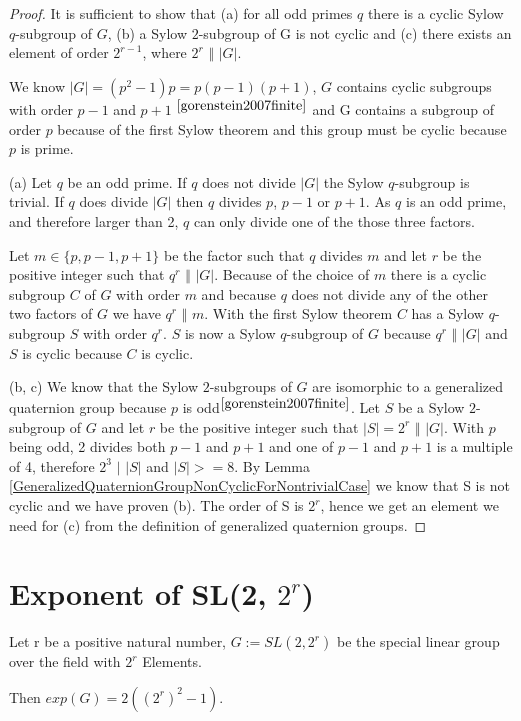 \documentclass[a4paper,10pt]{article}
\begin{document}
\begin{proof}
	It is sufficient to show that (a) for all odd primes $q$ there is a cyclic Sylow $q$-subgroup of $G$, (b) a Sylow $2$-subgroup of G is not cyclic and (c) there exists an element of order $2^{r-1}$, where $2^r$ $\Vert$ $|G|$.

	We know $|G| = (p^2-1)p = p(p-1)(p+1)$, $G$ contains cyclic subgroups with order $p-1$ and $p+1$ $^{\cite[p. 40-42]{gorenstein2007finite}}$ and G contains a subgroup of order $p$ because of the first Sylow theorem and this group must be cyclic because $p$ is prime.

	(a) Let $q$ be an odd prime. If $q$ does not divide $|G|$ the Sylow $q$-subgroup is trivial. If $q$ does divide $|G|$ then $q$ divides $p$, $p-1$ or $p+1$. As $q$ is an odd prime, and therefore larger than 2, $q$ can only divide one of the those three factors. 

	Let $m \in \{ p, p-1, p+1\}$ be the factor such that $q$ divides $m$ and let $r$ be the positive integer such that $q^r$ $\Vert$ $|G|$. Because of the choice of $m$ there is a cyclic subgroup $C$ of $G$ with order $m$ and because $q$ does not divide any of the other two factors of $G$ we have $q^r$ $\Vert$ $m$. With the first Sylow theorem $C$ has a Sylow $q$-subgroup $S$ with order $q^r$. $S$ is now a Sylow $q$-subgroup of $G$ because $q^r$ $\Vert$ $|G|$ and $S$ is cyclic because $C$ is cyclic. 

	(b, c) We know that the Sylow $2$-subgroups of $G$ are isomorphic to a generalized quaternion group because $p$ is odd$^{\cite[p. 42]{gorenstein2007finite}}$. Let $S$ be a Sylow $2$-subgroup of $G$ and let $r$ be the positive integer such that $|S| = 2^r$ $\Vert$ $|G|$. With $p$ being odd, 2 divides both $p-1$ and $p+1$ and one of $p-1$ and $p+1$ is a multiple of 4, therefore $2^3$ $\vert$ $|S|$ and $|S| >= 8$. By Lemma \ref{GeneralizedQuaternionGroupNonCyclicForNontrivialCase} we know that S is not cyclic and we have proven (b). The order of S is $2^r$, hence we get an element we need for (c) from the definition of generalized quaternion groups.
\end{proof}

\section{Exponent of SL(2, $2^r$)}

\begin{theorem}
	Let r be a positive natural number, $G := SL(2, 2^r)$ be the special linear group over the field with $2^r$ Elements.

	Then $exp(G) = 2((2^r)^2 - 1)$.
\end{theorem}
\end{document}
